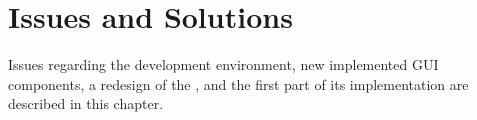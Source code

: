 
\chapter{Issues and Solutions}
Issues regarding the development environment, new implemented GUI components, a redesign of the \ct, and the first part of its implementation are described in this chapter.








